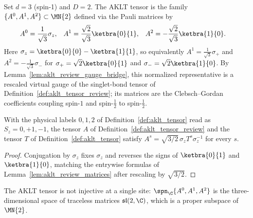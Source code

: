 \begin{definition}\label{def:aklt_tensor}
    \leanok
    Set $d = 3$ (spin-1) and $D = 2$. The AKLT tensor is the family
    $\{A^0, A^1, A^2\} \subset \MN{2}$ defined via the Pauli matrices by
    \begin{align}
        A^0 & = \frac{1}{\sqrt{3}} \sigma_z,
            & A^1                            & = \frac{\sqrt{2}}{\sqrt{3}} \ketbra{0}{1},
            & A^2                            & = -\frac{\sqrt{2}}{\sqrt{3}} \ketbra{1}{0}.
        \notag
    \end{align}
    Here $\sigma_z = \ketbra{0}{0} - \ketbra{1}{1}$, so equivalently
    $A^1 = \frac{1}{\sqrt{3}} \sigma_+$ and
    $A^2 = -\frac{1}{\sqrt{3}} \sigma_-$ for
    $\sigma_+ = \sqrt{2} \ketbra{0}{1}$ and
    $\sigma_- = \sqrt{2} \ketbra{1}{0}$. By
    Lemma~\ref{lem:aklt_review_gauge_bridge}, this normalized representative
    is a rescaled virtual gauge of the singlet-bond tensor of
    Definition~\ref{def:aklt_tensor_review}; its matrices are the
    Clebsch--Gordan coefficients coupling spin-$1$ and spin-$\tfrac12$ to
    spin-$\tfrac12$.
\end{definition}

\begin{lemma}%
    \label{lem:aklt_review_gauge_bridge}
    \leanok
    With the physical labels $0,1,2$ of Definition~\ref{def:aklt_tensor} read as
    $S_z=0,+1,-1$, the tensor $A$ of Definition~\ref{def:aklt_tensor_review} and
    the tensor $T$ of Definition~\ref{def:aklt_tensor} satisfy
    $A^{s}=\sqrt{3/2}\,\sigma_z T^{s}\sigma_z^{-1}$ for every $s$.
\end{lemma}
\begin{proof}
    \leanok
    Conjugation by $\sigma_z$ fixes $\sigma_z$ and reverses the signs of
    $\ketbra{0}{1}$ and $\ketbra{1}{0}$, matching the entrywise formulas of
    Lemma~\ref{lem:aklt_review_matrices} after rescaling by $\sqrt{3/2}$.
\end{proof}

\begin{lemma}\label{thm:aklt_not_injective}
    \leanok
    The AKLT tensor is not injective at a single site:
    $\spn_{\C}\{A^0, A^1, A^2\}$ is the three-dimensional space of
    traceless matrices $\mathfrak{sl}(2,\C)$, which is a proper
    subspace of~$\MN{2}$.
\end{lemma}

